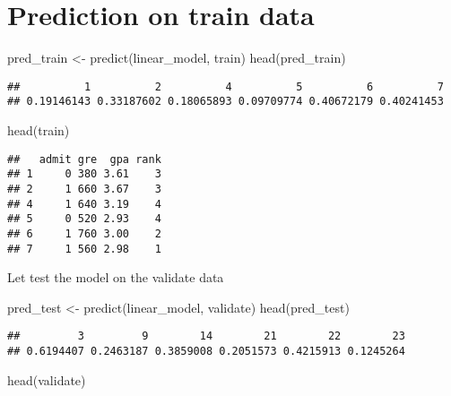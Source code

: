 \documentclass[
]{article}
\newenvironment{Shaded}{\begin{snugshade}}{\end{snugshade}}
\newcommand{\FunctionTok}[1]{\textcolor[rgb]{0.00,0.00,0.00}{#1}}
\newcommand{\NormalTok}[1]{#1}
\newcommand{\OtherTok}[1]{\textcolor[rgb]{0.56,0.35,0.01}{#1}}
\begin{document}
\hypertarget{prediction-on-train-data}{%
\section{Prediction on train data}\label{prediction-on-train-data}}

\begin{Shaded}
\begin{Highlighting}[]
\NormalTok{pred\_train }\OtherTok{\textless{}{-}} \FunctionTok{predict}\NormalTok{(linear\_model, train)}
\FunctionTok{head}\NormalTok{(pred\_train)}
\end{Highlighting}
\end{Shaded}

\begin{verbatim}
##          1          2          4          5          6          7 
## 0.19146143 0.33187602 0.18065893 0.09709774 0.40672179 0.40241453
\end{verbatim}

\begin{Shaded}
\begin{Highlighting}[]
\FunctionTok{head}\NormalTok{(train)}
\end{Highlighting}
\end{Shaded}

\begin{verbatim}
##   admit gre  gpa rank
## 1     0 380 3.61    3
## 2     1 660 3.67    3
## 4     1 640 3.19    4
## 5     0 520 2.93    4
## 6     1 760 3.00    2
## 7     1 560 2.98    1
\end{verbatim}

Let test the model on the validate data

\begin{Shaded}
\begin{Highlighting}[]
\NormalTok{pred\_test }\OtherTok{\textless{}{-}} \FunctionTok{predict}\NormalTok{(linear\_model, validate)}
\FunctionTok{head}\NormalTok{(pred\_test)}
\end{Highlighting}
\end{Shaded}

\begin{verbatim}
##         3         9        14        21        22        23 
## 0.6194407 0.2463187 0.3859008 0.2051573 0.4215913 0.1245264
\end{verbatim}

\begin{Shaded}
\begin{Highlighting}[]
\FunctionTok{head}\NormalTok{(validate)}
\end{Highlighting}
\end{Shaded}
\end{document}
